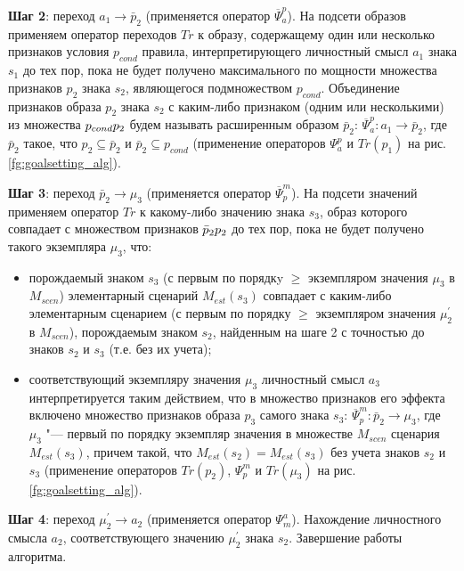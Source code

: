 \textbf{Шаг 2}: переход $a_1\rightarrow\bar p_2$  (применяется оператор $\overline{\Psi}_a^p$). На подсети образов применяем оператор переходов $Tr$ к образу, содержащему один или несколько признаков условия $p_{cond}$ правила, интерпретирующего личностный смысл $a_1$ знака $s_1$ до тех пор, пока не будет получено максимального по мощности множества признаков $p_2$ знака $s_2$, являющегося подмножеством $p_{cond}$. Объединение признаков образа $p_2$ знака $s_2$ с каким-либо признаком (одним или несколькими) из множества $p_{cond}\\p_2$ будем называть расширенным образом $\bar p_2$: $\overline{\Psi}_a^p:a_1\rightarrow\bar p_2$, где $\bar p_2$ такое, что $p_2\subseteq\bar p_2$  и  $\bar p_2\subseteq p_{cond}$ (применение операторов $\Psi_a^p$ и $Tr(p_1)$ на рис. \ref{fg:goalsetting_alg}).

\textbf{Шаг 3}: переход $\bar p_2\rightarrow\mu_3$ (применяется оператор $\overline{\Psi}_p^m$). На подсети значений применяем оператор $Tr$ к какому-либо значению знака $s_3$, образ которого совпадает с множеством признаков $\bar p_2\\p_2$ до тех пор, пока не будет получено такого экземпляра $\mu_3$, что:
\begin{itemize}
	\item порождаемый знаком $s_3$ (с первым по порядкy $\geqslant$ экземпляром значения $\mu_3$ в $M_{scen}$) элементарный сценарий $M_{est}(s_3)$ совпадает с каким-либо элементарным сценарием (с первым по порядку $\geqslant$ экземпляром значения $\mu^\prime_2$ в $M_{scen}$), порождаемым знаком $s_2$, найденным на шаге 2 с точностью до знаков $s_2$ и $s_3$ (т.е. без их учета);
	\item соответствующий экземпляру значения $\mu_3$ личностный смысл $a_3$ интерпретируется таким действием, что в множество признаков его эффекта включено множество признаков образа $p_3$ самого знака $s_3$: $\overline{\Psi}_p^m:\bar p_2\rightarrow\mu_3$, где $\mu_3$ "--- первый по порядку экземпляр значения в множестве $M_{scen}$ сценария $M_{est}(s_3)$, причем   такой, что $M_{est}(s_2)=M_{est}(s_3)$ без учета знаков $s_2$ и $s_3$ (применение операторов $Tr(p_2)$, $\Psi_p^m$ и $Tr(\mu_3)$ на рис. \ref{fg:goalsetting_alg}).
\end{itemize}

\textbf{Шаг 4}: переход $\mu^\prime_2\rightarrow a_2$ (применяется оператор $\Psi_m^a$). Нахождение личностного смысла $a_2$, соответствующего значению $\mu^\prime_2$ знака $s_2$. Завершение работы алгоритма.

